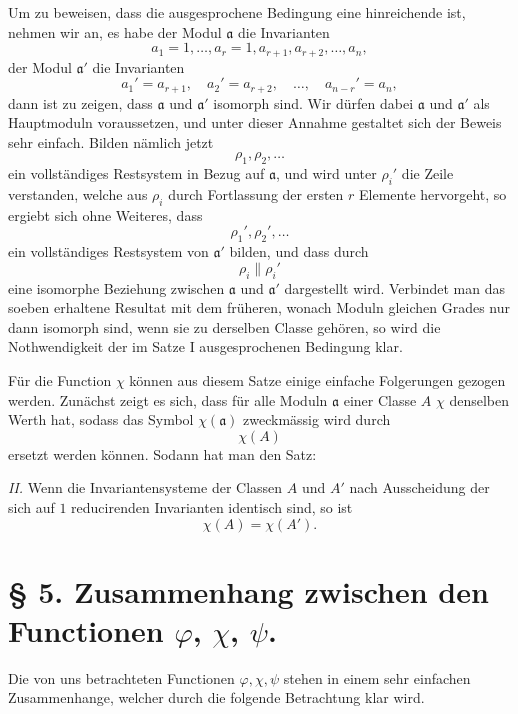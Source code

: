 \documentclass[11pt,a4paper]{article}
\begin{document}
Um zu beweisen, dass die ausgesprochene Bedingung eine hinreichende ist, nehmen wir an, es habe der Modul $\mathfrak a$ die Invarianten
\[
 a_1=1,\ldots,a_r=1,a_{r+1},a_{r+2},\ldots,a_n,
\]
der Modul $\mathfrak a'$ die Invarianten
\[
 a_1'=a_{r+1},\quad a_2'=a_{r+2},\quad\ldots,\quad a_{n-r}'=a_n,
\]
dann ist zu zeigen, dass $\mathfrak a$ und $\mathfrak a'$ isomorph sind. Wir dürfen dabei $\mathfrak a$ und $\mathfrak a'$ als Hauptmoduln voraussetzen, und unter dieser Annahme gestaltet sich der Beweis sehr einfach. Bilden nämlich jetzt
\[
 \rho_1,\rho_2,\ldots
\]
ein vollständiges Restsystem in Bezug auf $\mathfrak a$, und wird unter $\rho_i'$ die Zeile verstanden, welche aus $\rho_i$ durch Fortlassung der ersten $r$ Elemente hervorgeht, so ergiebt sich ohne Weiteres, dass
\[
 \rho_1',\rho_2',\ldots
\]
ein vollständiges Restsystem von $\mathfrak a'$ bilden, und dass durch
\[
 \rho_i\parallel\rho_i'
\]
eine isomorphe Beziehung zwischen $\mathfrak a$ und $\mathfrak a'$ dargestellt wird. Verbindet man das soeben erhaltene Resultat mit dem früheren, wonach Moduln gleichen Grades nur dann isomorph sind, wenn sie zu derselben Classe gehören, so wird die Nothwendigkeit der im Satze I ausgesprochenen Bedingung klar.

Für die Function $\chi$ können aus diesem Satze einige einfache Folgerungen gezogen werden. Zunächst zeigt es sich, dass für alle Moduln $\mathfrak a$ einer Classe $A$ $\chi$ denselben Werth hat, sodass das Symbol $\chi(\mathfrak a)$ zweckmässig wird durch
\[
 \chi(A)
\]
ersetzt werden können. Sodann hat man den Satz:

\emph{II.} Wenn die Invariantensysteme der Classen $A$ und $A'$ nach Ausscheidung der sich auf $1$ reducirenden Invarianten identisch sind, so ist
\[
 \chi(A)=\chi(A').
\]

\section*{§ 5. Zusammenhang zwischen den Functionen $\varphi$, $\chi$, $\psi$.}

Die von uns betrachteten Functionen $\varphi,\chi,\psi$ stehen in einem sehr einfachen Zusammenhange, welcher durch die folgende Betrachtung klar wird.
\end{document}
